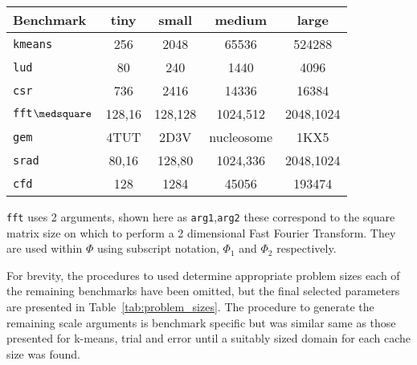 \documentclass[../document.tex]{subfiles}
\begin{document}
\begin{table*}[t]
\centering
\begin{threeparttable}
    \centering
    \caption{OpenDwarf workload scale parameters $\Phi$}
    \begin{tabular}{l|c|c|c|c}
        \bf Benchmark         & \bf tiny   & small  & medium     & large\\\hline
        {\tt kmeans}          & 256        & 2048   & 65536      & 524288\\
        {\tt lud}             & 80         & 240    & 1440       & 4096\\
        {\tt csr}             & 736        & 2416   & 14336      & 16384\\
        {\tt fft}$\medsquare$ & 128,16     & 128,128& 1024,512   & 2048,1024\\
        {\tt gem}             & 4TUT       & 2D3V   & nucleosome & 1KX5\\
        {\tt srad}            & 80,16      & 128,80 & 1024,336   & 2048,1024\\
        {\tt cfd}             & 128        & 1284   & 45056      & 193474
    \end{tabular}
    \begin{tablenotes}
    \item [$\medsquare$] {\tt fft} uses 2 arguments, shown here as {\tt arg1},{\tt arg2} these correspond to the square matrix size on which to perform a 2 dimensional Fast Fourier Transform. They are used within $\Phi$ using subscript notation, $\Phi_1$ and $\Phi_2$ respectively.
    \end{tablenotes}
    \label{tab:problem_sizes}
\end{threeparttable}
\end{table*}

For brevity, the procedures to used determine appropriate problem sizes each of the remaining benchmarks have been omitted, but the final selected parameters are presented in Table~\ref{tab:problem_sizes}.
The procedure to generate the remaining scale arguments is benchmark specific but was similar same as those presented for k-means, trial and error until a suitably sized domain for each cache size was found.
\end{document}
